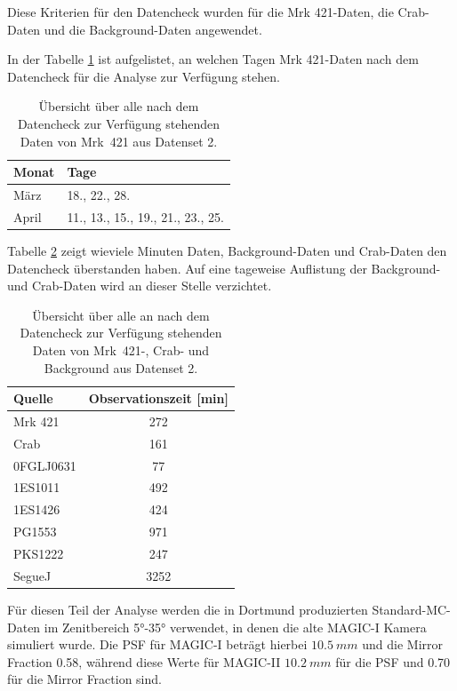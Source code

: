 Diese Kriterien für den Datencheck wurden für die Mrk 421-Daten, die Crab-Daten und die Background-Daten angewendet.

In der Tabelle \ref{tab:Datenset2-Mrk421} ist aufgelistet, an welchen Tagen Mrk 421-Daten nach dem Datencheck für die Analyse zur Verfügung stehen.


\begin{table}[!h]
\centering
\caption{Übersicht über alle nach dem Datencheck zur Verfügung stehenden Daten von Mrk~421 aus Datenset 2.}
\label{tab:Datenset2-Mrk421}
\begin{tabular}{ll}
  \toprule
  Monat & Tage\\
  \midrule
  \midrule
März & 18., 22., 28.\\
April & 11., 13., 15., 19., 21., 23., 25. \\
  \bottomrule
\end{tabular}
\end{table}

Tabelle \ref{tab:Datenset2} zeigt wieviele Minuten Daten, Background-Daten und Crab-Daten den Datencheck überstanden haben. 
Auf eine tageweise Auflistung der Background- und Crab-Daten wird an dieser Stelle verzichtet.

\begin{table}[!h]
\centering
\caption{Übersicht über alle an nach dem Datencheck zur Verfügung stehenden Daten von Mrk~421-, Crab- und Background aus Datenset 2.}
\label{tab:Datenset2}
\begin{tabular}{lc}
  \toprule
  Quelle & Observationszeit [min]\\
  \midrule
  \midrule
  Mrk 421 & 272\\
  \midrule
  Crab & 161\\
  \midrule
  0FGLJ0631 & 77 \\
  1ES1011 & 492 \\
  1ES1426 & 424 \\
  PG1553 & 971 \\
  PKS1222 & 247 \\
  SegueJ & 3252 \\
  \bottomrule
\end{tabular}
\end{table}

Für diesen Teil der Analyse werden die in Dortmund produzierten Standard-MC-Daten im Zenitbereich 5°-35° verwendet, in denen die alte MAGIC-I Kamera simuliert wurde.
Die PSF für MAGIC-I beträgt hierbei $\SI{10,5}{mm}$ und die Mirror Fraction 0.58, während diese Werte für MAGIC-II $\SI{10,2}{mm}$ für die PSF und 0.70 für die Mirror Fraction sind.

